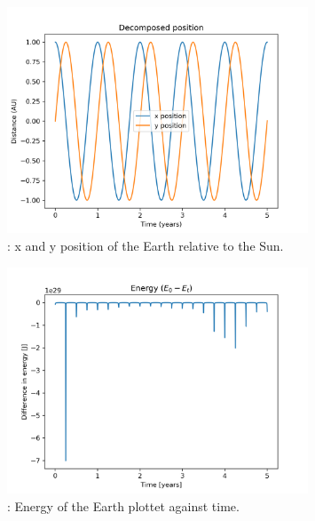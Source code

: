 \documentclass{article}
\begin{document}
\begin{figure}[H]
    \begin{center}
        \includegraphics[width=0.8\textwidth]{./Plot/xy_vs_time.png}
        \caption{: x and y position of the Earth relative to the Sun.}
        \label{fig:position}
    \end{center}
\end{figure}

\begin{figure}[H]
    \begin{center}
        \includegraphics[width=0.8\textwidth]{./Plot/energy.png}
        \caption{: Energy of the Earth plottet against time.
        }
        \label{fig:energy}
    \end{center}
\end{figure}
\end{document}
